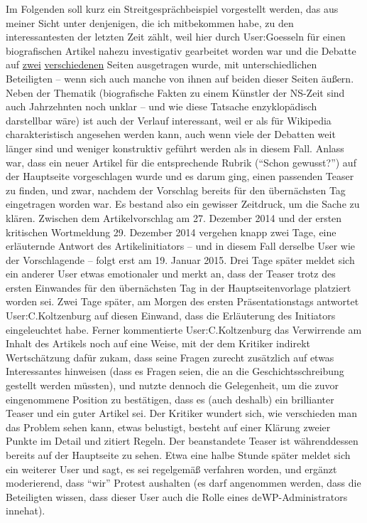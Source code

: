 \documentclass[fontsize=12pt]{scrartcl}
\begin{document}
Im Folgenden soll kurz ein Streitgespr\"achbeispiel vorgestellt werden, das aus meiner Sicht unter denjenigen, die ich mitbekommen habe, zu den interessantesten der letzten Zeit z\"ahlt, weil \mbox{hier} durch \mbox{User}:Goesseln f\"ur einen biografischen Artikel nahezu investigativ gearbeitet worden war und die Debatte auf \href{https://de.wikipedia.org/wiki/Wikipedia_Diskussion:Hauptseite/Schon_gewusst/Diskussionsarchiv/2014/Dezember#Eigenvorschlag:_Hans_Haffenrichter_.284._Dezember.29_.28erl..29}{zwei} \href{https://de.wikipedia.org/wiki/Wikipedia_Diskussion:Hauptseite/Archiv/2015/Januar#Kein_Beleg}{verschiedenen} Sei\-ten ausgetragen wurde, mit unterschiedlichen Beteiligten -- wenn sich auch manche von ihnen auf beiden dieser Sei\-ten \"au{\ss}ern. Neben der Thematik (biografische Fakten zu einem K\"unstler\textsuperscript{\tiny *} der NS-Zeit sind auch Jahrzehnten noch unklar -- und wie diese Tatsache enzyklop\"adisch darstellbar w\"are) ist auch der Verlauf interessant, weil er als f\"ur Wi\-ki\-pe\-dia charakteristisch angesehen werden kann, auch wenn viele der Debatten weit l\"anger sind und weniger konstruktiv gef\"uhrt werden als in diesem Fall. Anlass war, dass ein neuer Artikel f\"ur die entsprechende Rubrik ("`Schon gewusst?"') auf der Hauptseite vorgeschlagen wurde und es darum ging, einen passenden Teaser zu finden, und zwar, nachdem der Vorschlag bereits f\"ur den \"ubern\"achsten Tag eingetragen worden war. Es bestand also ein gewisser Zeitdruck, um die Sache zu kl\"aren. Zwischen dem Artikelvorschlag am 27. Dezember 2014 und der ersten kritischen Wortmeldung 29. Dezember 2014 vergehen knapp zwei Tage, eine erl\"auternde Antwort des Artikelinitiators\textsuperscript{\tiny *} -- und in diesem Fall derselbe \mbox{User} wie der Vorschlagende -- folgt erst am 19. Januar 2015. Drei Tage sp\"ater meldet sich ein an\-de\-rer \mbox{User} etwas emotionaler und merkt an, dass der Teaser trotz des ersten Einwandes f\"ur den \"ubern\"achsten Tag in der Hauptsei\-tenvorlage platziert worden sei. Zwei Tage sp\"ater, am Morgen des ers\-ten Pr\"asentationstags antwortet \mbox{User}:C.Kolt\-zen\-burg auf diesen Einwand, dass die Erl\"auterung des Initiators\textsuperscript{\tiny *} eingeleuchtet habe. Ferner kommentierte \mbox{User}:C.Kolt\-zen\-burg das Verwirrende am Inhalt des Artikels noch auf eine Weise, mit der dem Kritiker\textsuperscript{\tiny *} indirekt Wertsch\"atzung daf\"ur zukam, dass seine Fragen zurecht zus\"atzlich auf etwas Interessantes hinweisen (dass es Fragen seien, die an die Geschichtsschreibung gestellt werden m\"ussten), und nutzte dennoch die Gelegenheit, um die zuvor eingenommene Position zu best\"atigen, dass es (auch deshalb) ein brillianter Teaser und ein guter Artikel sei. Der Kritiker\textsuperscript{\tiny *} wundert sich, wie verschieden man das Pro\-blem sehen kann, etwas belustigt, be\-steht auf einer Kl\"arung zweier Punkte im Detail und zitiert Regeln. Der beanstandete Teaser ist w\"ahrenddessen bereits auf der Hauptseite zu sehen. Etwa eine halbe Stunde sp\"ater meldet sich ein weiterer \mbox{User} und sagt, es sei regelgem\"a{\ss} verfahren worden, und erg\"anzt moderierend, dass "`wir"' Protest aushalten (es darf angenommen werden, dass die Beteiligten wissen, dass dieser \mbox{User} auch die Rolle eines deWP-Administrators innehat). 
\end{document}
